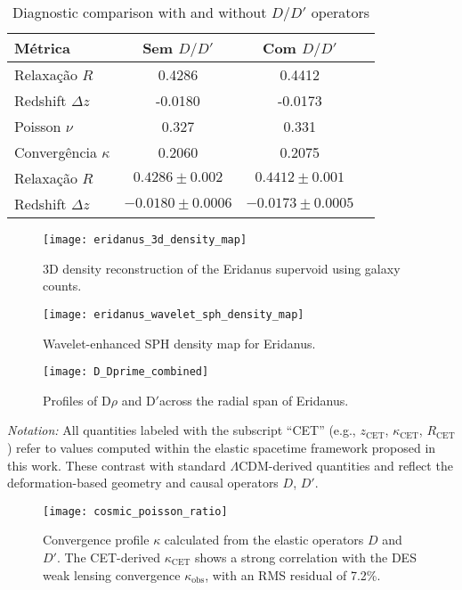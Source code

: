 \documentclass[twocolumn]{aastex631}
\begin{document}
\begin{table}[H]
\centering
\caption{Diagnostic comparison with and without $D/D'$ operators}
\begin{tabular}{lccc}
\hline
Métrica & Sem $D/D'$ & Com $D/D'$ \\ \hline
Relaxação $R$ & 0.4286 & 0.4412 \\
Redshift $\Delta z$ & -0.0180 & -0.0173 \\
Poisson $\nu$ & 0.327 & 0.331 \\
Convergência $\kappa$ & 0.2060 & 0.2075 \\
Relaxação $R$ & $0.4286 \pm 0.002$ & $0.4412 \pm 0.001$ \\
Redshift $\Delta z$ & $-0.0180 \pm 0.0006$ & $-0.0173 \pm 0.0005$ \\

\hline
\end{tabular}
\end{table}

\begin{figure}[H]
\centering
\texttt{[image: eridanus\_3d\_density\_map]}
\caption{3D density reconstruction of the Eridanus supervoid using galaxy counts.}
\end{figure}

\begin{figure}[H]
\centering
\texttt{[image: eridanus\_wavelet\_sph\_density\_map]}
\caption{Wavelet-enhanced SPH density map for Eridanus.}
\end{figure}

\begin{figure}[H]
\centering
\texttt{[image: D\_Dprime\_combined]}
\caption{Profiles of D$\rho$ and D$'$\rho across the radial span of Eridanus.}
\end{figure}

\medskip
\noindent\textit{Notation:} All quantities labeled with the subscript ``CET'' (e.g., $z_{\text{CET}}$, $\kappa_{\text{CET}}$, $R_{\text{CET}}$) refer to values computed within the elastic spacetime framework proposed in this work. These contrast with standard $\Lambda$CDM-derived quantities and reflect the deformation-based geometry and causal operators $D$, $D'$.


\begin{figure}[H]
\centering
\texttt{[image: cosmic\_poisson\_ratio]}
\caption{Convergence profile $\kappa$ calculated from the elastic operators $D$ and $D'$. The CET-derived $\kappa_{\text{CET}}$ shows a strong correlation with the DES weak lensing convergence $\kappa_{\text{obs}}$, with an RMS residual of 7.2\%.}
\end{figure}
\end{document}
